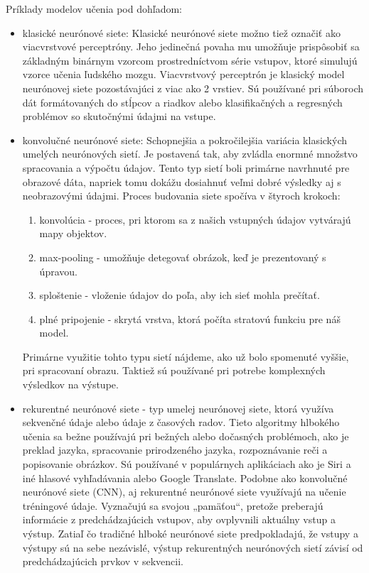 Príklady modelov učenia pod dohľadom:
\begin{itemize}
  \item klasické neurónové siete: Klasické neurónové siete možno tiež označiť ako viacvrstvové perceptróny. Jeho jedinečná povaha mu umožňuje prispôsobiť sa základným binárnym vzorcom prostredníctvom série vstupov, ktoré simulujú vzorce učenia ľudského mozgu. Viacvrstvový perceptrón je klasický model neurónovej siete pozostávajúci z viac ako 2 vrstiev. Sú používané pri súboroch dát formátovaných do stĺpcov a riadkov alebo klasifikačných a regresných problémov so skutočnými údajmi na vstupe.
  \item konvolučné neurónové siete: Schopnejšia a pokročilejšia variácia klasických umelých neurónových sietí. Je postavená tak, aby zvládla enormné množstvo spracovania a výpočtu údajov. Tento typ sietí boli primárne navrhnuté pre obrazové dáta, napriek tomu dokážu dosiahnuť veľmi dobré výsledky aj s neobrazovými údajmi. Proces budovania siete spočíva v štyroch krokoch: 
  \begin{enumerate}
      \item konvolúcia - proces, pri ktorom sa z našich vstupných údajov vytvárajú mapy objektov.
      \item max-pooling - umožňuje detegovať obrázok, keď je prezentovaný s úpravou.
      \item sploštenie - vloženie údajov do poľa, aby ich sieť mohla prečítať.
      \item plné pripojenie - skrytá vrstva, ktorá počíta stratovú funkciu pre náš model.
  \end{enumerate}
  Primárne využitie tohto typu sietí nájdeme, ako už bolo spomenuté vyššie, pri spracovaní obrazu. Taktiež sú používané pri potrebe komplexných výsledkov na výstupe.
  \item rekurentné neurónové siete - typ umelej neurónovej siete, ktorá využíva sekvenčné údaje alebo údaje z časových radov. Tieto algoritmy hlbokého učenia sa bežne používajú pri bežných alebo dočasných problémoch, ako je preklad jazyka, spracovanie prirodzeného jazyka, rozpoznávanie reči a popisovanie obrázkov. Sú používané v populárnych aplikáciach ako je Siri a iné hlasové vyhľadávania alebo Google Translate. Podobne ako konvolučné neurónové siete (CNN), aj rekurentné neurónové siete využívajú na učenie tréningové údaje. Vyznačujú sa svojou „pamäťou“, pretože preberajú informácie z predchádzajúcich vstupov, aby ovplyvnili aktuálny vstup a výstup. Zatiaľ čo tradičné hlboké neurónové siete predpokladajú, že vstupy a výstupy sú na sebe nezávislé, výstup rekurentných neurónových sietí závisí od predchádzajúcich prvkov v sekvencii.
\end{itemize}

